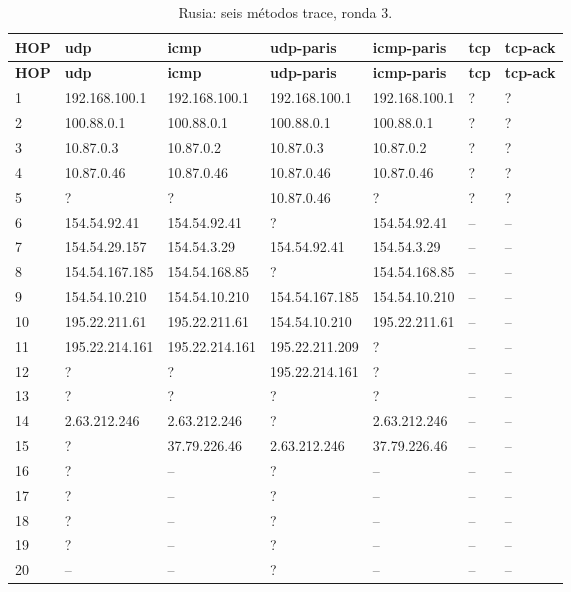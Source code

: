 \begin{longtable}{p{0.8cm}p{2.25cm}p{2.25cm}p{2.25cm}p{2.25cm}p{2.25cm}p{2.25cm}}
\caption{Rusia: seis métodos trace, ronda 3.}\label{anexo:trace:37.79.226.46:3} \\
\toprule
\textbf{HOP} & \textbf{udp} & \textbf{icmp} & \textbf{udp-paris} & \textbf{icmp-paris} & \textbf{tcp} & \textbf{tcp-ack} \\ \midrule
\endfirsthead
\toprule
\textbf{HOP} & \textbf{udp} & \textbf{icmp} & \textbf{udp-paris} & \textbf{icmp-paris} & \textbf{tcp} & \textbf{tcp-ack} \\ \midrule
\endhead
1 & 192.168.100.1 & 192.168.100.1 & 192.168.100.1 & 192.168.100.1 & ? & ? \\
2 & 100.88.0.1 & 100.88.0.1 & 100.88.0.1 & 100.88.0.1 & ? & ? \\
3 & 10.87.0.3 & 10.87.0.2 & 10.87.0.3 & 10.87.0.2 & ? & ? \\
4 & 10.87.0.46 & 10.87.0.46 & 10.87.0.46 & 10.87.0.46 & ? & ? \\
5 & ? & ? & 10.87.0.46 & ? & ? & ? \\
6 & 154.54.92.41 & 154.54.92.41 & ? & 154.54.92.41 & -- & -- \\
7 & 154.54.29.157 & 154.54.3.29 & 154.54.92.41 & 154.54.3.29 & -- & -- \\
8 & 154.54.167.185 & 154.54.168.85 & ? & 154.54.168.85 & -- & -- \\
9 & 154.54.10.210 & 154.54.10.210 & 154.54.167.185 & 154.54.10.210 & -- & -- \\
10 & 195.22.211.61 & 195.22.211.61 & 154.54.10.210 & 195.22.211.61 & -- & -- \\
11 & 195.22.214.161 & 195.22.214.161 & 195.22.211.209 & ? & -- & -- \\
12 & ? & ? & 195.22.214.161 & ? & -- & -- \\
13 & ? & ? & ? & ? & -- & -- \\
14 & 2.63.212.246 & 2.63.212.246 & ? & 2.63.212.246 & -- & -- \\
15 & ? & 37.79.226.46 & 2.63.212.246 & 37.79.226.46 & -- & -- \\
16 & ? & -- & ? & -- & -- & -- \\
17 & ? & -- & ? & -- & -- & -- \\
18 & ? & -- & ? & -- & -- & -- \\
19 & ? & -- & ? & -- & -- & -- \\
20 & -- & -- & ? & -- & -- & -- \\
\bottomrule
\end{longtable}
